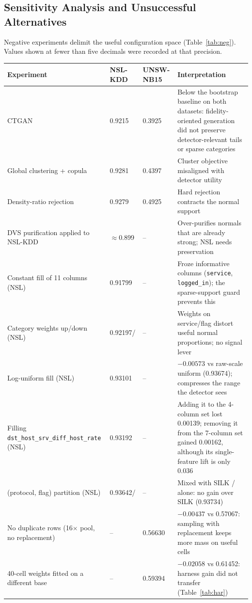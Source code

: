 \documentclass[10pt,a4paper]{article}
\begin{document}
\subsection{Sensitivity Analysis and Unsuccessful Alternatives}
Negative experiments delimit the useful configuration space (Table~\ref{tab:neg}). Values shown at fewer than five decimals were recorded at that precision.
\begin{table}[H]\centering\small
\begin{tabular}{P{3.3cm}P{1.45cm}P{1.45cm}P{8.0cm}}\toprule
Experiment & NSL-KDD & UNSW-NB15 & Interpretation\\\midrule
CTGAN~\cite{ctgan} & 0.9215 & 0.3925 & Below the bootstrap baseline on both datasets: fidelity-oriented generation did not preserve detector-relevant tails or sparse categories\\
Global clustering + copula & 0.9281 & 0.4397 & Cluster objective misaligned with detector utility\\
Density-ratio rejection & 0.9279 & 0.4925 & Hard rejection contracts the normal support\\
DVS purification applied to NSL-KDD & $\approx$0.899 & -- & Over-purifies normals that are already strong; NSL needs preservation\\
Constant fill of 11 columns (NSL) & 0.91799 & -- & Froze informative columns (\texttt{service}, \texttt{logged\_\allowbreak in}); the sparse-support guard prevents this\\
Category weights up/down (NSL) & 0.92197/ & -- & Weights on service/flag distort useful normal proportions; no signal lever\\
Log-uniform fill (NSL) & 0.93101 & -- & $-0.00573$ vs raw-scale uniform (0.93674); compresses the range the detector sees\\
Filling \texttt{dst\_\allowbreak host\_\allowbreak srv\_\allowbreak \allowbreak diff\_\allowbreak host\_\allowbreak rate} (NSL) & 0.93192 & -- & Adding it to the 4-column set lost 0.00139; removing it from the 7-column set gained 0.00162, although its single-feature lift is only 0.036\\
(protocol, flag) partition (NSL) & 0.93642/ & -- & Mixed with SILK / alone: no gain over SILK (0.93734)\\
No duplicate rows (16$\times$ pool, no replacement) & -- & 0.56630 & $-0.00437$ vs 0.57067: sampling with replacement keeps more mass on useful cells\\
40-cell weights fitted on a different base & -- & 0.59394 & $-0.02058$ vs 0.61452: harness gain did not transfer (Table~\ref{tab:har})\\

\end{tabular}
\end{table}
\end{document}
